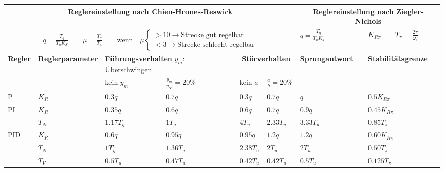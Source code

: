 \begin{table}
	\centering
	\renewcommand\arraystretch{1.2}
	\begin{tabular}{|l|p{1.8cm}|l|l|l|l||l|l|}
			\hline
			\multicolumn{6}{|c||}{
				\textbf{Reglereinstellung nach Chien-Hrones-Reswick}
			} &
			\multicolumn{2}{|c|}{
				\textbf{Reglereinstellung nach Ziegler-Nichols}
			}
		\\ \hline
		\multicolumn{6}{|c||}{
			$
			q = \frac{T_g}{T_uK_S} \qquad \mu = \frac{T_g}{T_u}
			\qquad \text{wenn} \quad \mu
			\begin{cases}
				> 10 \rightarrow \text{Strecke gut regelbar} \\
				< 3 \rightarrow \text{Strecke schlecht regelbar}
			\end{cases}
			$
		} & $q=\frac{T_g}{T_uK_s}$ & $K_{R\pi} \qquad T_\pi=\frac{2\pi}{\omega_\pi}$
		\\ \hline
		\textbf{Regler} & \textbf{Regler\-parameter} &
		\multicolumn{2}{|p{3.5cm}|}{\textbf{Führungsverhalten} \newline $y_m$:
		Überschwingen} &
		\multicolumn{2}{|c||}{\textbf{Störverhalten}} &
		\textbf{Sprungantwort} & \textbf{Stabilitätsgrenze}
		\\ \hline
		& & kein $y_m$ & $\frac{y_m}{y_\infty} = 20 \%$ & kein $a$ & $\frac{a}{b}= 20 \%$ & &
		\\ \hline
		P		& $K_R$		& $0.3q$	& $0.7q$	& $0.3q$	& $0.7q$	& $q$		& $0.5K_{R\pi}$
		\\ \hline
		PI	& $K_R$		& $0.35q$	& $0.6q$	& $0.6q$	& $0.7q$	& $0.9q$	& $0.45K_{R\pi}$
		\\
				& $T_N$		& $1.17T_g$	& $1T_g$	& $4T_u$	& $2.33T_u$ & $3.33T_u$ &
				$0.85T_{\pi}$ \\ \hline
		PID & $K_R$		& $0.6q$	& $0.95q$	& $0.95q$	& $1.2q$	& $1.2q$	& $0.60K_{R\pi}$
		\\
			& $T_N$		& $1T_g$	& $1.36T_g$	& $2.38T_u$	& $2T_u$	& $2T_u$	& $0.50T_\pi$
		\\
			& $T_V$		& $0.5T_u$	& $0.47T_u$	& $0.42T_u$	& $0.42T_u$ & $0.5T_u$	& $0.125T_\pi$
		\\ \hline
	\end{tabular}
\end{table}




